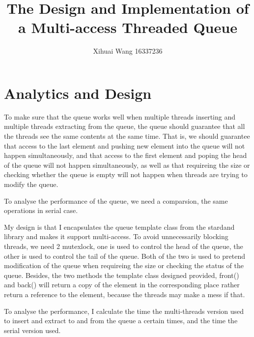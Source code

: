 \documentclass{article}
\title{The Design and Implementation of a Multi-access Threaded Queue}
\author{Xihuai Wang 16337236}
\date{}
\begin{document}
	\maketitle
	\tableofcontents
	\section{Analytics and Design} %
	\label{sec:analytics}
	To make sure that the queue works well when multiple threads inserting and multiple threads extracting from the queue, the queue should guarantee that all the threads see the same contents at the same time. That is, we should guarantee that access to the last element and pushing new element into the queue will not happen simultaneously, and that access to the first element and poping the head of the queue will not happen simultaneously, as well as that requireing the size or checking whether the queue is empty will not happen when threads are trying to modify the queue. 
	\par To analyse the performance of the queue, we need a comparsion, the same operations in serial case.
	\par My design is that I encapsulates the queue template class from the stardand library and makes it support multi-access. To avoid unnecessarily blocking threads, we need 2 mutexlock, one is used to control the head of the queue, the other is used to control the tail of the queue. Both of the two is used to pretend modification of the queue when requireing the size or checking the status of the queue. Besides, the two methods the template class designed provided, front() and back() will return a copy of the element in the corresponding place rather return a reference to the element, because the threads may make a mess if that.
	\par To analyse the performance, I calculate the time the multi-threads version used to insert and extract to and from the queue a certain times, and the time the serial version used.
\end{document}
